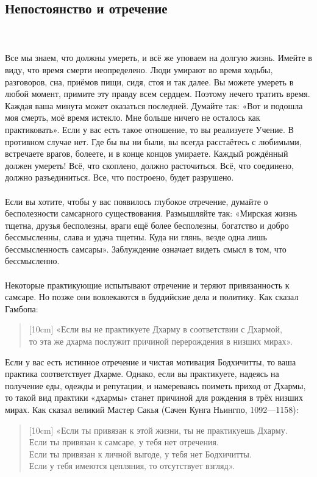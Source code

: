 \subsection{Непостоянство и отречение}
\\ \\ Все мы знаем, что должны умереть, и всё же уповаем на долгую жизнь. Имейте в виду, что время смерти неопределено. Люди умирают во время ходьбы, разговоров, сна, приёмов пищи, сидя, стоя и так далее. Вы можете умереть в любой момент, примите эту правду всем сердцем. Поэтому нечего тратить время. Каждая ваша минута может оказаться последней. Думайте так: «Вот и подошла моя смерть, моё время истекло. Мне больше ничего не осталось как практиковать». Если у вас есть такое отношение, то вы реализуете Учение. В противном случае нет. Где бы вы ни были, вы всегда расстаётесь с любимыми, встречаете врагов, болеете, и в конце концов умираете. Каждый рождённый должен умереть! Всё, что скоплено, должно расточиться. Всё, что соединено, должно разъединиться. Все, что построено, будет разрушено.
\\ \\ Если вы хотите, чтобы у вас появилось глубокое отречение, думайте о бесполезности самсарного существования. Размышляйте так: «Мирская жизнь тщетна, друзья бесполезны, враги ещё более бесполезны, богатство и добро бессмысленны, слава и удача тщетны. Куда ни глянь, везде одна лишь бессмысленность самсары». Заблуждение означает видеть смысл в том, что бессмысленно.
\\ \\ Некоторые практикующие испытывают отречение и теряют привязанность к самсаре. Но позже они вовлекаются в буддийские дела и политику. Как сказал Гамбопа:
\begin{verse}[10cm]
«Если вы не практикуете Дхарму в соответствии с Дхармой,
\\ \indent то эта же дхарма послужит причиной перерождения в низших мирах».
\end{verse}
Если у вас есть истинное отречение и чистая мотивация Бодхичитты,
то ваша практика соответствует Дхарме. Однако, если вы практикуете,
надеясь на получение еды, одежды и репутации, и намереваясь поиметь
приход от Дхармы, то такой вид практики «дхармы» станет причиной для
рождения в трёх низших мирах. Как сказал великий Мастер Сакья
(Сачен Кунга Ньингпо, 1092—1158):
\begin{verse}[10cm]
«Если ты привязан к этой жизни, ты не практикуешь Дхарму.
\\ Если ты привязан к самсаре, у тебя нет отречения.
\\ Если ты привязан к личной выгоде, у тебя нет Бодхичитты.
\\ Если у тебя имеются цепляния, то отсутствует взгляд».
\end{verse}
